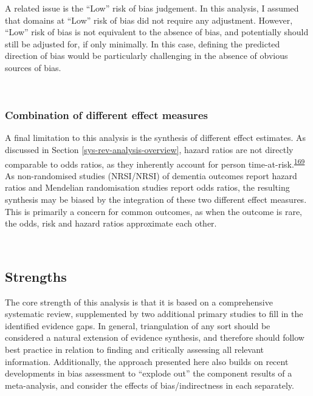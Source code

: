 \documentclass[a4paper, twoside]{templates/ociamthesis}
\begin{document}
A related issue is the ``Low'' risk of bias judgement. In this analysis, I assumed that domains at ``Low'' risk of bias did not require any adjustment. However, ``Low'' risk of bias is not equivalent to the absence of bias, and potentially should still be adjusted for, if only minimally. In this case, defining the predicted direction of bias would be particularly challenging in the absence of obvious sources of bias.

~

\hypertarget{combination-of-different-effect-measures}{%
\subsubsection{Combination of different effect measures}\label{combination-of-different-effect-measures}}

A final limitation to this analysis is the synthesis of different effect estimates. As discussed in Section \ref{sys-rev-analysis-overview}, hazard ratios are not directly comparable to odds ratios, as they inherently account for person time-at-risk.\textsuperscript{\protect\hyperlink{ref-mckenzie2019}{169}} As non-randomised studies (NRSI/NRSI) of dementia outcomes report hazard ratios and Mendelian randomisation studies report odds ratios, the resulting synthesis may be biased by the integration of these two different effect measures. This is primarily a concern for common outcomes, as when the outcome is rare, the odds, risk and hazard ratios approximate each other.

~

\hypertarget{strengths-2}{%
\subsection{Strengths}\label{strengths-2}}

The core strength of this analysis is that it is based on a comprehensive systematic review, supplemented by two additional primary studies to fill in the identified evidence gaps. In general, triangulation of any sort should be considered a natural extension of evidence synthesis, and therefore should follow best practice in relation to finding and critically assessing all relevant information. Additionally, the approach presented here also builds on recent developments in bias assessment to ``explode out'' the component results of a meta-analysis, and consider the effects of bias/indirectness in each separately.
\end{document}

